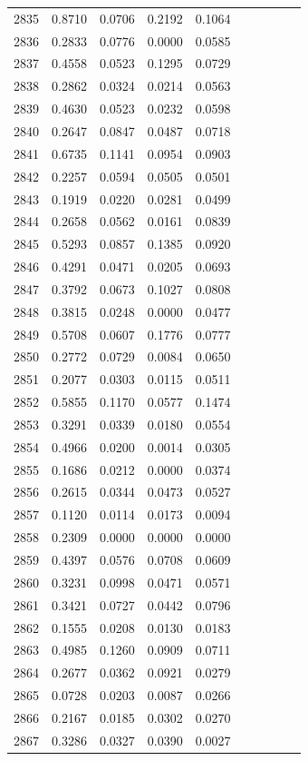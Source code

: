 \begin{table}
\begin{tabular}{cccccccccc}
2835& 0.8710& 0.0706& 0.2192& 0.1064\\ 
2836& 0.2833& 0.0776& 0.0000& 0.0585\\ 
2837& 0.4558& 0.0523& 0.1295& 0.0729\\ 
2838& 0.2862& 0.0324& 0.0214& 0.0563\\ 
2839& 0.4630& 0.0523& 0.0232& 0.0598\\ 
2840& 0.2647& 0.0847& 0.0487& 0.0718\\ 
2841& 0.6735& 0.1141& 0.0954& 0.0903\\ 
2842& 0.2257& 0.0594& 0.0505& 0.0501\\ 
2843& 0.1919& 0.0220& 0.0281& 0.0499\\ 
2844& 0.2658& 0.0562& 0.0161& 0.0839\\ 
2845& 0.5293& 0.0857& 0.1385& 0.0920\\ 
2846& 0.4291& 0.0471& 0.0205& 0.0693\\ 
2847& 0.3792& 0.0673& 0.1027& 0.0808\\ 
2848& 0.3815& 0.0248& 0.0000& 0.0477\\ 
2849& 0.5708& 0.0607& 0.1776& 0.0777\\ 
2850& 0.2772& 0.0729& 0.0084& 0.0650\\ 
2851& 0.2077& 0.0303& 0.0115& 0.0511\\ 
2852& 0.5855& 0.1170& 0.0577& 0.1474\\ 
2853& 0.3291& 0.0339& 0.0180& 0.0554\\ 
2854& 0.4966& 0.0200& 0.0014& 0.0305\\ 
2855& 0.1686& 0.0212& 0.0000& 0.0374\\ 
2856& 0.2615& 0.0344& 0.0473& 0.0527\\ 
2857& 0.1120& 0.0114& 0.0173& 0.0094\\ 
2858& 0.2309& 0.0000& 0.0000& 0.0000\\ 
2859& 0.4397& 0.0576& 0.0708& 0.0609\\ 
2860& 0.3231& 0.0998& 0.0471& 0.0571\\ 
2861& 0.3421& 0.0727& 0.0442& 0.0796\\ 
2862& 0.1555& 0.0208& 0.0130& 0.0183\\ 
2863& 0.4985& 0.1260& 0.0909& 0.0711\\ 
2864& 0.2677& 0.0362& 0.0921& 0.0279\\ 
2865& 0.0728& 0.0203& 0.0087& 0.0266\\ 
2866& 0.2167& 0.0185& 0.0302& 0.0270\\ 
2867& 0.3286& 0.0327& 0.0390& 0.0027\\ 

\end{tabular}
\end{table}
